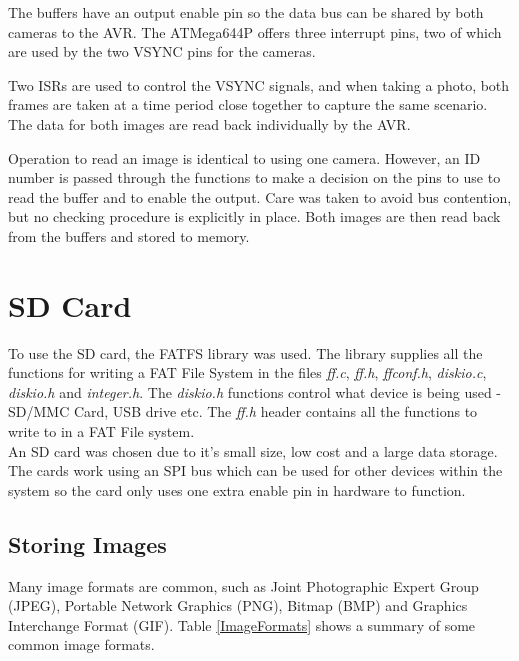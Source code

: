 The buffers have an output enable pin so the data bus can be shared by both cameras to the AVR. The ATMega644P offers three interrupt pins, two of which are used by the two VSYNC pins for the cameras.

Two ISRs are used to control the VSYNC signals, and when taking a photo, both frames are taken at a time period close together to capture the same scenario. The data for both images are read back individually by the AVR. 

Operation to read an image is identical to using one camera. However, an ID number is passed through the functions to make a decision on the pins to use to read the buffer and to enable the output. Care was taken to avoid bus contention, but no checking procedure is explicitly in place. Both images are then read back from the buffers and stored to memory. 

\section{SD Card} \label{sect:SDCard}

To use the SD card, the FATFS library \citep{FATFS} was used. The library supplies all the functions for writing a FAT File System in the files \textit{ff.c}, \textit{ff.h}, \textit{ffconf.h}, \textit{diskio.c}, \textit{diskio.h} and \textit{integer.h}. The \textit{diskio.h} functions control what device is being used - SD/MMC Card, USB drive etc. The \textit{ff.h} header contains all the functions to write to in a FAT File system. 
\\
An SD card was chosen due to it's small size, low cost and a large data storage. The cards work using an SPI bus which can be used for other devices within the system so the card only uses one extra enable pin in hardware to function. 

\subsection{Storing Images}

Many image formats are common, such as Joint Photographic Expert Group (JPEG), Portable Network Graphics (PNG), Bitmap (BMP) and Graphics Interchange Format (GIF). Table \ref{ImageFormats} shows a summary of some common image formats.


